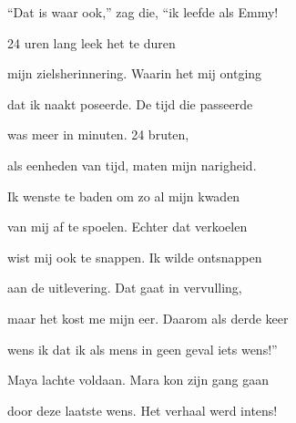 “Dat is waar ook,” zag die,
“ik leefde als Emmy!

24 uren
lang leek het te duren

mijn zielsherinnering.
Waarin het mij ontging

dat ik naakt poseerde.
De tijd die passeerde

was meer in minuten.
24 bruten,

als eenheden van tijd,
maten mijn narigheid.

Ik wenste te baden
om zo al mijn kwaden

van mij af te spoelen.
Echter dat verkoelen

wist mij ook te snappen.
Ik wilde ontsnappen

aan de uitlevering.
Dat gaat in vervulling,

maar het kost me mijn eer.
Daarom als derde keer

wens ik dat ik als mens
in geen geval iets wens!”

Maya lachte voldaan.
Mara kon zijn gang gaan

door deze laatste wens.
Het verhaal werd intens!
